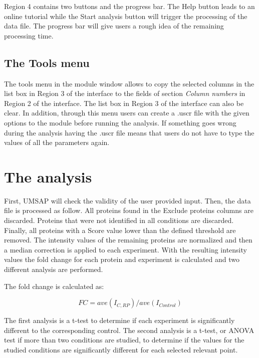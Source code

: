 Region \num{4} contains two buttons and the progress bar. The Help button leads to an online tutorial while the Start analysis button will trigger the processing of the data file. The progress bar will give users a rough idea of the remaining processing time.

\subsection{The Tools menu}

The tools menu in the module window allows to copy the selected columns in the list box in Region \num{3} of the interface to the fields of section \textit{Column numbers} in Region \num{2} of the interface. The list box in Region \num{3} of the interface can also be clear. In addition, through this menu users can create a .uscr file with the given options to the module before running the analysis. If something goes wrong during the analysis having the .uscr file means that users do not have to type the values of all the parameters again.   

\section{The analysis}
\label{sec:protprofTTest}

First, UMSAP will check the validity of the user provided input. Then, the data file is processed as follow. All proteins found in the Exclude proteins columns are discarded. Proteins that were not identified in all conditions are discarded. Finally, all proteins with a Score value lower than the defined threshold are removed. The intensity values of the remaining proteins are normalized and then a median correction is applied to each experiment. With the resulting intensity values the fold change for each protein and experiment is calculated and two different analysis are performed.

The fold change is calculated as: 

\begin{equation}
\label{eq:protprofFC}
FC = ave(I_{C, RP}) / ave(I_{Control})
\end{equation}

The first analysis is a t-test to determine if each experiment is significantly different to the corresponding control. The second analysis is a t-test, or ANOVA test if more than two conditions are studied, to determine if the values for the studied conditions are significantly different for each selected relevant point.

